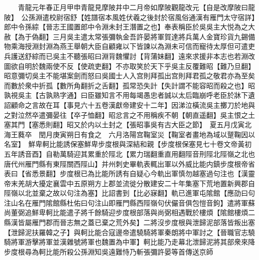 　　青龍元年春正月甲申青龍見摩陂井中二月帝如摩陂觀龍改元【自是改摩陂曰龍陂】　公孫淵遣校尉宿舒【姓譜宿本風姓伏羲之後封於宿風俗通漢有雁門太守宿詳】郎中令孫綜【晉志王國置郎中令淵未封王潛置之也】奉表稱臣於吳吳主大悦為之大赦【為于偽翻】三月吳主遣太常張彌執金吾許晏將軍賀達將兵萬人金寶珍貨九錫備物乘海授淵封淵為燕王舉朝大臣自顧雍以下皆諫以為淵未可信而寵待太厚但可遣吏兵護送舒綜而已吳主不聽張昭曰淵背魏懼討【背蒲妹翻】遠來求援非本志也若淵改圖欲自明於魏兩使不反【使疏吏翻】不亦取笑於天下乎吳主反覆難昭【難乃旦翻】昭意彌切吳主不能堪案劍而怒曰吳國士人入宫則拜孤出宫則拜君孤之敬君亦為至矣而數於衆中折孤【數所角翻折之舌翻】孤常恐失計【失計謂不能容昭而殺之也】昭孰視吳主【古孰熟字通】曰臣雖知言不用每竭愚忠者誠以太后臨崩呼老臣於牀下遺詔顧命之言故在耳【事見六十五卷漢獻帝建安十二年】因涕泣橫流吳主擲刀於地與之對泣然卒遣彌晏往【卒子恤翻】昭忿言之不用稱疾不朝【朝直遥翻】吳主恨之土塞其門【塞悉則翻】昭又於内以土封之【張昭事吳有古大臣之節】　夏五月戊寅北海王蕤卒　閏月庚寅朔日有食之　六月洛陽宫鞠室災【鞠室者畫地為域以蹵鞠因以名室】　鮮卑軻比能誘保塞鮮卑步度根與深結和親【步度根保塞見七十卷文帝黃初五年誘音酉】自勒萬騎迎其累重於陘北【累力瑞翻重直用翻陘音刑陘北陘嶺之北也唐代州雁門縣有東陘關西陘山】并州刺史畢軌表輒出軍以外威比能内鎮步度根帝省表曰【省悉景翻】步度根已為比能所誘有自疑心今軌出軍慎勿越塞過句注也【漢靈帝末羌胡大擾定襄雲中五原朔方上郡並流徙分散建安二十年集塞下荒地置新興郡自陘嶺以北並棄之故以句注為塞】比詔書到【比必寐翻】軌已進軍屯隂館【應劭曰句注山名在雁門隂館縣杜佑曰句注山即雁門縣西陘嶺句伏儼音俱包愷音鉤】遣將軍蘇尚董弼追鮮卑軻比能遣子將千餘騎迎步度根部落與尚弼相遇戰於樓煩【隂館樓煩二縣漢皆屬雁門郡而晉志無之蓋已棄之荒外矣】二將沒步度根與泄歸泥部落皆叛出塞【泄歸泥扶羅韓之子】與軻比能合寇邊帝遣驍騎將軍秦朗將中軍討之【晉職官志驍騎將軍游擊將軍並漢雜號將軍也魏置為中軍】軻比能乃走幕北泄歸泥將其部衆來降步度根尋為軻比能所殺公孫淵知吳遠難恃乃斬張彌許晏等首傳送京師

